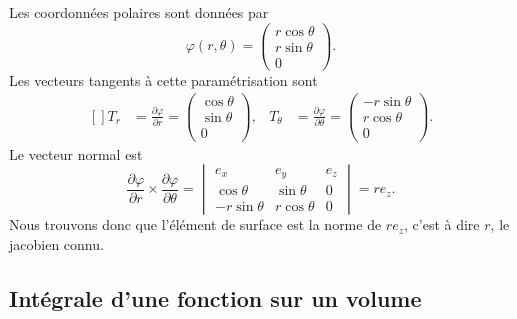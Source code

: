 \begin{example}
    Les coordonnées polaires sont données par
    \begin{equation}
        \varphi(r,\theta)=\begin{pmatrix}
            r\cos\theta    \\
            r\sin\theta    \\
            0
        \end{pmatrix}.
    \end{equation}
    Les vecteurs tangents à cette paramétrisation sont
    \begin{equation}
        \begin{aligned}[]
            T_r&=\frac{ \partial \varphi }{ \partial r }=\begin{pmatrix}
                \cos\theta    \\
                \sin\theta    \\
                0
            \end{pmatrix},&T_{\theta}&=\frac{ \partial \varphi }{ \partial \theta }=\begin{pmatrix}
                -r\sin\theta    \\
                r\cos\theta    \\
                0
            \end{pmatrix}.
        \end{aligned}
    \end{equation}
    Le vecteur normal est
    \begin{equation}
        \frac{ \partial \varphi }{ \partial r }\times\frac{ \partial \varphi }{ \partial \theta }=\begin{vmatrix}
            e_x    &   e_y    &   e_z    \\
            \cos\theta    &   \sin\theta    &   0    \\
            -r\sin\theta    &   r\cos\theta    &   0
        \end{vmatrix}=re_z.
    \end{equation}
    Nous trouvons donc que l'élément de surface est la norme de $re_z$, c'est à dire $r$, le jacobien connu.
\end{example}

\subsection{Intégrale d'une fonction sur un volume}

